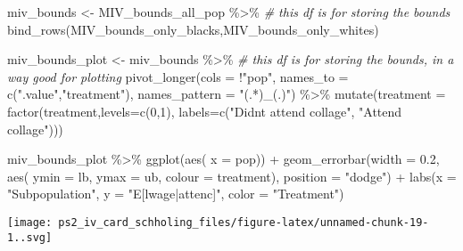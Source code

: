 \documentclass[
]{article}
\newenvironment{Shaded}{\begin{snugshade}}{\end{snugshade}}
\newcommand{\AttributeTok}[1]{\textcolor[rgb]{0.77,0.63,0.00}{#1}}
\newcommand{\CommentTok}[1]{\textcolor[rgb]{0.56,0.35,0.01}{\textit{#1}}}
\newcommand{\DecValTok}[1]{\textcolor[rgb]{0.00,0.00,0.81}{#1}}
\newcommand{\FloatTok}[1]{\textcolor[rgb]{0.00,0.00,0.81}{#1}}
\newcommand{\FunctionTok}[1]{\textcolor[rgb]{0.00,0.00,0.00}{#1}}
\newcommand{\NormalTok}[1]{#1}
\newcommand{\OtherTok}[1]{\textcolor[rgb]{0.56,0.35,0.01}{#1}}
\newcommand{\SpecialCharTok}[1]{\textcolor[rgb]{0.00,0.00,0.00}{#1}}
\newcommand{\StringTok}[1]{\textcolor[rgb]{0.31,0.60,0.02}{#1}}
\begin{document}
\begin{Shaded}
\begin{Highlighting}[]
\NormalTok{miv\_bounds }\OtherTok{\textless{}{-}}\NormalTok{ MIV\_bounds\_all\_pop }\SpecialCharTok{\%\textgreater{}\%}  \CommentTok{\# this df is for storing the bounds}
  \FunctionTok{bind\_rows}\NormalTok{(MIV\_bounds\_only\_blacks,MIV\_bounds\_only\_whites)}

\NormalTok{miv\_bounds\_plot }\OtherTok{\textless{}{-}}\NormalTok{ miv\_bounds }\SpecialCharTok{\%\textgreater{}\%}   \CommentTok{\# this df is for storing the bounds, in a way good for plotting}
  \FunctionTok{pivot\_longer}\NormalTok{(}\AttributeTok{cols =} \SpecialCharTok{!}\StringTok{"pop"}\NormalTok{,}
               \AttributeTok{names\_to =} \FunctionTok{c}\NormalTok{(}\StringTok{".value"}\NormalTok{,}\StringTok{"treatment"}\NormalTok{),}
               \AttributeTok{names\_pattern =} \StringTok{"(.*)\_(.)"}\NormalTok{) }\SpecialCharTok{\%\textgreater{}\%}  
  \FunctionTok{mutate}\NormalTok{(}\AttributeTok{treatment =} \FunctionTok{factor}\NormalTok{(treatment,}\AttributeTok{levels=}\FunctionTok{c}\NormalTok{(}\DecValTok{0}\NormalTok{,}\DecValTok{1}\NormalTok{), }\AttributeTok{labels=}\FunctionTok{c}\NormalTok{(}\StringTok{"Didn\textquotesingle{}t attend collage"}\NormalTok{, }\StringTok{"Attend collage"}\NormalTok{)))}
         
\NormalTok{miv\_bounds\_plot }\SpecialCharTok{\%\textgreater{}\%} \FunctionTok{ggplot}\NormalTok{(}\FunctionTok{aes}\NormalTok{(}
  \AttributeTok{x =}\NormalTok{ pop)) }\SpecialCharTok{+}
  \FunctionTok{geom\_errorbar}\NormalTok{(}\AttributeTok{width =} \FloatTok{0.2}\NormalTok{, }\FunctionTok{aes}\NormalTok{(}
    \AttributeTok{ymin =}\NormalTok{ lb,}
    \AttributeTok{ymax =}\NormalTok{ ub,}
    \AttributeTok{colour =}\NormalTok{ treatment),}
    \AttributeTok{position =} \StringTok{"dodge"}\NormalTok{) }\SpecialCharTok{+}
  \FunctionTok{labs}\NormalTok{(}\AttributeTok{x =} \StringTok{"Subpopulation"}\NormalTok{, }\AttributeTok{y =} \StringTok{"E[lwage|attenc]"}\NormalTok{, }\AttributeTok{color =} \StringTok{"Treatment"}\NormalTok{)}
\end{Highlighting}
\end{Shaded}

\texttt{[image: ps2\_iv\_card\_schholing\_files/figure-latex/unnamed-chunk-19-1..svg]}
\end{document}

